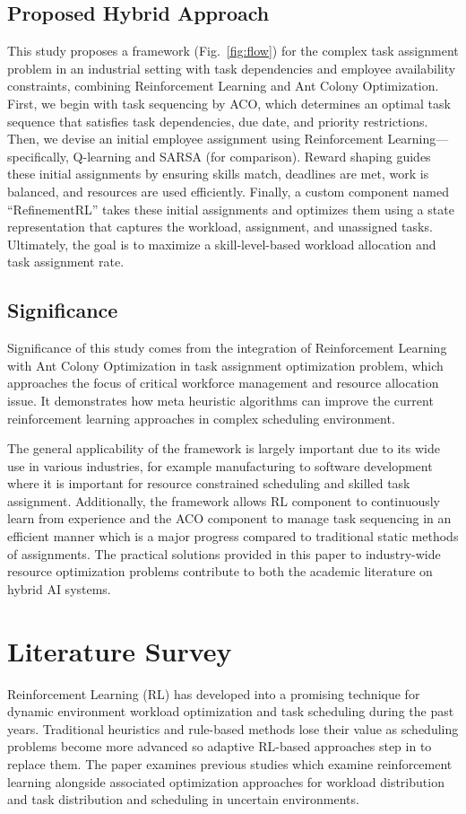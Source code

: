 \documentclass[%
aip,
cp,  %
amsmath,amssymb,
reprint,%
]{revtex4-2}
\begin{document}
	\subsection{\label{subsec:hybrid}Proposed Hybrid Approach}
	This study proposes a framework (Fig.~\ref{fig:flow}) for the complex task
	assignment problem in an industrial setting with task dependencies and
	employee availability constraints, combining Reinforcement Learning and Ant Colony
	Optimization. First, we begin with task sequencing by ACO, which determines an
	optimal task sequence that satisfies task dependencies, due date, and priority
	restrictions. Then, we devise an initial employee assignment using
	Reinforcement Learning—specifically, Q-learning and SARSA (for comparison).
	Reward shaping guides these initial assignments by ensuring skills match, deadlines
	are met, work is balanced, and resources are used efficiently. Finally, a custom
	component named ``RefinementRL'' takes these initial assignments and optimizes
	them using a state representation that captures the workload, assignment, and unassigned
	tasks. Ultimately, the goal is to maximize a skill-level-based workload allocation
	and task assignment rate.
	
	\subsection{\label{subsec:significance}Significance}
	Significance of this study comes from the integration of Reinforcement Learning
	with Ant Colony Optimization in task assignment optimization problem, which
	approaches the focus of critical workforce management and resource allocation
	issue. It demonstrates how meta heuristic algorithms can improve the current reinforcement
	learning approaches in complex scheduling environment.
	
	The general applicability of the framework is largely important due to its wide
	use in various industries, for example manufacturing to software development
	where it is important for resource constrained scheduling and skilled task
	assignment. Additionally, the framework allows RL component to continuously
	learn from experience and the ACO component to manage task sequencing in an
	efficient manner which is a major progress compared to traditional static
	methods of assignments. The practical solutions provided in this paper to industry-wide
	resource optimization problems contribute to both the academic literature on hybrid
	AI systems.
	
	\section{\label{sec:lit}Literature Survey}
	Reinforcement Learning (RL) has developed into a promising technique for dynamic
	environment workload optimization and task scheduling during the past years.
	Traditional heuristics and rule-based methods lose their value as scheduling
	problems become more advanced so adaptive RL-based approaches step in to
	replace them. The paper examines previous studies which examine reinforcement learning
	alongside associated optimization approaches for workload distribution and task
	distribution and scheduling in uncertain environments.
	
\end{document}
